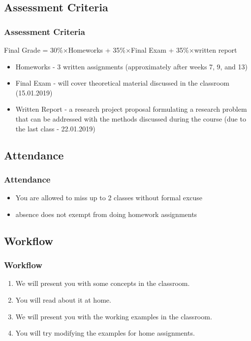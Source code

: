 \subsection[Assessment]{Assessment Criteria}
\begin{frame}
    \frametitle{Assessment Criteria}
    \begin{block}{}
        Final Grade = 30\%$\times$Homeworks + 35\%$\times$Final Exam + 35\%$\times$written report\\
    \end{block}
        \begin{itemize}
        \item Homeworks - 3 written assignments (approximately after weeks 7, 9, and 13)
        \item Final Exam - will cover theoretical material discussed in the classroom (15.01.2019)
        \item Written Report - a research project proposal formulating a research problem that can be addressed with the methods discussed during the course (due to the last class - 22.01.2019)
    \end{itemize}
\end{frame}

\subsection[Attendance]{Attendance}
\begin{frame}
    \frametitle{Attendance}
    \begin{itemize}
        \item You are allowed to miss up to 2 classes without formal excuse
        \item  absence does not exempt from doing homework assignments
    \end{itemize}
\end{frame}

\subsection[Workflow]{Workflow}
\begin{frame}
    \frametitle{Workflow}
    \begin{enumerate}
        \item We will present you with some concepts in the classroom.
        \item You will read about it at home.
        \item We will present you with the working examples in the classroom.
        \item You will try modifying the examples for home assignments.
    \end{enumerate}
\end{frame}

